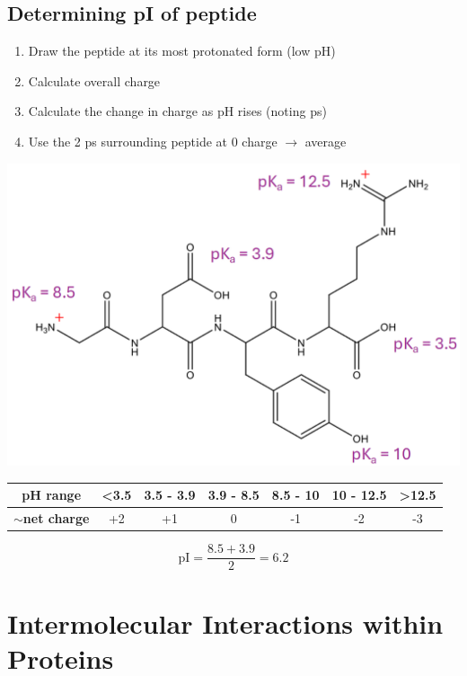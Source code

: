 \documentclass[10pt]{article}
\newcommand{\ka}{\text{$K_\text{a}$}}
\begin{document}
\subsection*{Determining pI of peptide}
\begin{enumerate}
    \item Draw the peptide at its most protonated form (low pH)
    \item Calculate overall charge
    \item Calculate the change in charge as pH rises (noting p\ka s)
    \item Use the 2 p\ka s surrounding peptide at 0 charge $\rightarrow$ average
\end{enumerate}
\begin{center}
    \includegraphics[width=\textwidth]{L2_13.png}
    \begin{tabular}{|c|c|c|c|c|c|c|}
        \hline
        \textbf{pH range} & \textless 3.5 & 3.5 - 3.9 & 3.9 - 8.5 & 8.5 - 10 & 10 - 12.5 & \textgreater 12.5 \\ \hline
        \textbf{$\sim$net charge} & +2 & +1 & 0 & -1 & -2 & -3 \\ \hline
    \end{tabular}
\end{center}
\[\text{pI} = \frac{8.5 + 3.9}{2} \boxed{= 6.2}\]
\section*{Intermolecular Interactions within Proteins}
\end{document}
